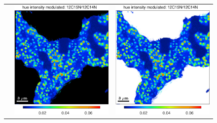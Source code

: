 \begin{figure}[!ht]
\begin{tabular}{ccc}
&
\includegraphics[scale=\sc, valign=t]{figs6/12C15N-12C14Nb}
&
\includegraphics[scale=\sc, valign=t]{figs6/12C15N-12C14Nc}

\end{tabular}
\end{figure}
